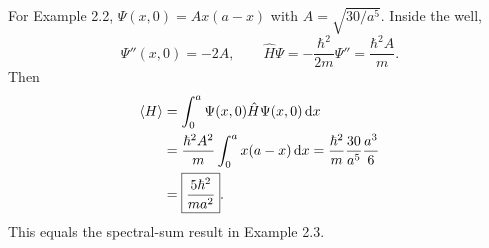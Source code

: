For Example 2.2, $\Psi(x,0)=A x(a-x)$ with
$A=\sqrt{30/a^5}$. Inside the well,
\begin{equation}
\Psi''(x,0)=-2A,\qquad
\hat H\Psi=-\frac{\hbar^2}{2m}\Psi''
=\frac{\hbar^2 A}{m}.
\end{equation}
Then
\begin{align}
\left\langle H\right\rangle&=\int_0^a\Psi(x,0)\hat H\Psi(x,0)\,\mathrm d x\\
&=\frac{\hbar^2A^2}{m}\int_0^a x(a-x)\,\mathrm d x
=\frac{\hbar^2}{m}\frac{30}{a^5}\frac{a^3}{6}\\
&=\boxed{\frac{5\hbar^2}{ma^2}}.
\end{align}
This equals the spectral-sum result in Example 2.3.
